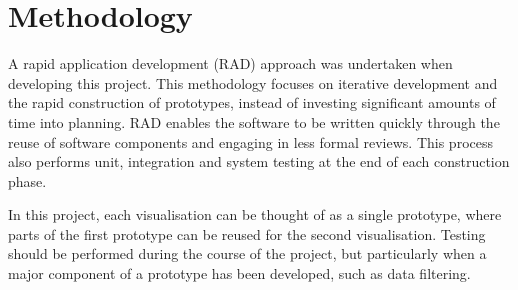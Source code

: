 \section{Methodology} {
\label{sec:methodology}

	A rapid application development (RAD) approach was undertaken when developing this project. This methodology focuses on iterative development and the rapid construction of prototypes, instead of investing significant amounts of time into planning. RAD enables the software to be written quickly through the reuse of software components and engaging in less formal reviews. This process also performs unit, integration and system testing at the end of each construction phase.


	In this project, each visualisation can be thought of as a single prototype, where parts of the first prototype can be reused for the second visualisation. Testing should be performed during the course of the project, but particularly when a major component of a prototype has been developed, such as data filtering.


	

		
		
		
}

